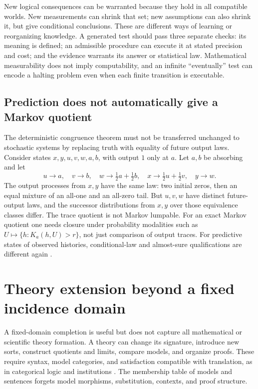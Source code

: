 \documentclass[11pt]{article}
\theoremstyle{definition}
\begin{document}
New logical consequences can be warranted because they hold in all
compatible worlds. New measurements can shrink that set; new assumptions
can also shrink it, but give conditional conclusions. These are different
ways of learning or reorganizing knowledge. A generated test should pass
three separate checks: its meaning is defined; an admissible procedure can
execute it at stated precision and cost; and the evidence warrants its
answer or statistical law. Mathematical measurability does not imply
computability, and an infinite ``eventually'' test can encode a halting
problem even when each finite transition is executable.

\subsection{Prediction does not automatically give a Markov quotient}

The deterministic congruence theorem must not be transferred unchanged to
stochastic systems by replacing truth with equality of future output laws.
Consider states $x,y,u,v,w,a,b$, with output $1$ only at $a$. Let $a,b$
be absorbing and let
\[
 u\to a,\quad v\to b,\quad
 w\to\tfrac12a+\tfrac12b,\quad
 x\to\tfrac12u+\tfrac12v,\quad y\to w.
\]
The output processes from $x,y$ have the same law: two initial zeros,
then an equal mixture of an all-one and an all-zero tail. But $u,v,w$
have distinct future-output laws, and the successor distributions from
$x,y$ over those equivalence classes differ. The trace quotient is not
Markov lumpable. For an exact Markov quotient one needs closure under
probability modalities such as
$U\mapsto\{h:K_a(h,U)>r\}$, not just comparison of output traces.
For predictive states of observed histories, conditional-law and almost-sure
qualifications are different again \cite{ShaliziCrutchfield}.

\section{Theory extension beyond a fixed incidence domain}
\label{sec:limits}

A fixed-domain completion is useful but does not capture all mathematical
or scientific theory formation. A theory can change its signature, introduce
new sorts, construct quotients and limits, compare models, and organize
proofs. These require syntax, model categories, and satisfaction compatible
with translation, as in categorical logic and institutions
\cite{Lawvere,GoguenBurstall}. The membership table of models and sentences
forgets model morphisms, substitution, contexts, and proof structure.
\end{document}
